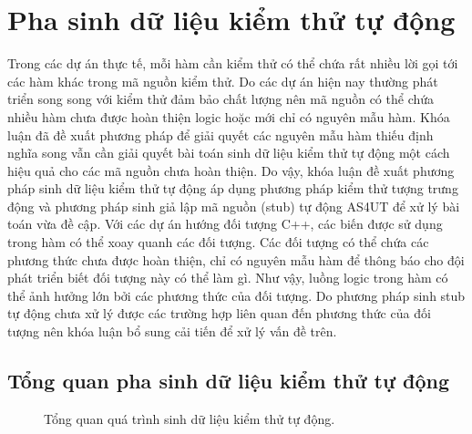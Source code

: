 \section{Pha sinh dữ liệu kiểm thử tự động} \label{sec:autogen}
Trong các dự án thực tế, mỗi hàm cần kiểm thử có thể chứa rất nhiều lời gọi tới các hàm khác trong mã nguồn kiểm thử. Do các dự án hiện nay thường phát triển song song với kiểm thử đảm bảo chất lượng nên mã nguồn có thể chứa nhiều hàm chưa được hoàn thiện logic hoặc mới chỉ có nguyên mẫu hàm. Khóa luận đã đề xuất phương pháp để giải quyết các nguyên mẫu hàm thiếu định nghĩa song vẫn cần giải quyết bài toán sinh dữ liệu kiểm thử tự động một cách hiệu quả cho các mã nguồn chưa hoàn thiện. Do vậy, khóa luận đề xuất phương pháp sinh dữ liệu kiểm thử tự động áp dụng phương pháp kiểm thử tượng trưng động \cite{DART, CUTE, TUNG2022106821} và phương pháp sinh giả lập mã nguồn (stub) tự động AS4UT \cite{9953784} để xử lý bài toán vừa đề cập. Với các dự án hướng đối tượng C++, các biến được sử dụng trong hàm có thể xoay quanh các đối tượng. Các đối tượng có thể chứa các phương thức chưa được hoàn thiện, chỉ có nguyên mẫu hàm để thông báo cho đội phát triển biết đối tượng này có thể làm gì. Như vậy, luồng logic trong hàm có thể ảnh hưởng lớn bởi các phương thức của đối tượng. Do phương pháp sinh stub tự động chưa xử lý được các trường hợp liên quan đến phương thức của đối tượng nên khóa luận bổ sung cải tiến để xử lý vấn đề trên.

\subsection{Tổng quan pha sinh dữ liệu kiểm thử tự động}

\begin{figure}[hb]
    \centering
    
    \caption{Tổng quan quá trình sinh dữ liệu kiểm thử tự động.}
    \label{fig:autogen-flow}
\end{figure}

